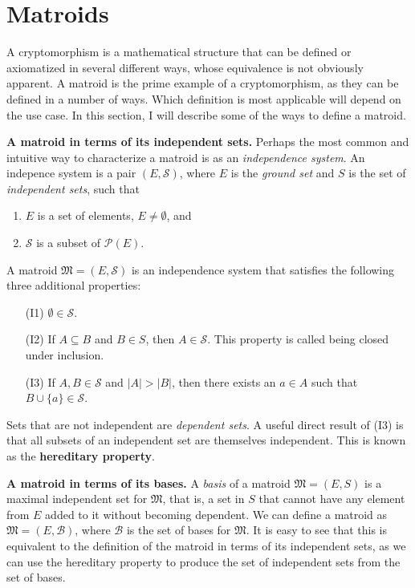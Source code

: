 \section{Matroids}\label{background/matroids}
A cryptomorphism is a mathematical structure that can be defined or axiomatized in several different ways, whose equivalence is not obviously apparent. A matroid is the prime example of a cryptomorphism, as they can be defined in a number of ways. Which definition is most applicable will depend on the use case. In this section, I will describe some of the ways to define a matroid.



\textbf{A matroid in terms of its independent sets.} Perhaps the most common and intuitive way to characterize a matroid is as an \textit{independence system}. An indepence system is a pair $(E,\mathcal{S})$, where $E$ is the \textit{ground set} and $S$ is the set of \textit{independent sets}, such that

\begin{enumerate}[align=left]
  \item $E$ is a set of elements, $E \not = \emptyset$, and
  \item $\mathcal{S}$ is a subset of $\mathcal{P}(E)$.
\end{enumerate}

A matroid $\mathfrak{M} = (E, \mathcal{S})$ is an independence system that satisfies the following three additional properties:

\begin{enumerate}[align=left]
  \item [(I1)] $\emptyset \in \mathcal{S}$.
  \item [(I2)] If $A \subseteq B$ and $B \in S$, then $A \in \mathcal{S}$. This property is called being closed under inclusion.
  \item [(I3)] If $A,B \in \mathcal{S}$ and $|A| > |B|$, then there exists an $a \in A$ such that $B \cup \{a\} \in \mathcal{S}$.
\end{enumerate}

Sets that are not independent are \textit{dependent sets}. A useful direct result of (I3) is that all subsets of an independent set are themselves independent. This is known as the \textbf{hereditary property}.



\textbf{A matroid in terms of its bases.} A \textit{basis} of a matroid $\mathfrak{M} = (E,S)$ is a maximal independent set for $\mathfrak{M}$, that is, a set in $S$ that cannot have any element from $E$ added to it without becoming dependent. We can define a matroid as $\mathfrak{M} = (E, \mathcal{B})$, where $\mathcal{B}$ is the set of bases for $\mathfrak{M}$. It is easy to see that this is equivalent to the definition of the matroid in terms of its independent sets, as we can use the hereditary property to produce the set of independent sets from the set of bases.

